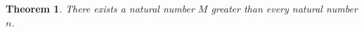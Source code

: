 \documentclass{article}
\newtheorem{theorem}{Theorem}
\begin{document}
\begin{theorem}\label{thm:X03}
There exists a natural number $M$ greater than every natural number $n$.
\end{theorem}
\end{document}
